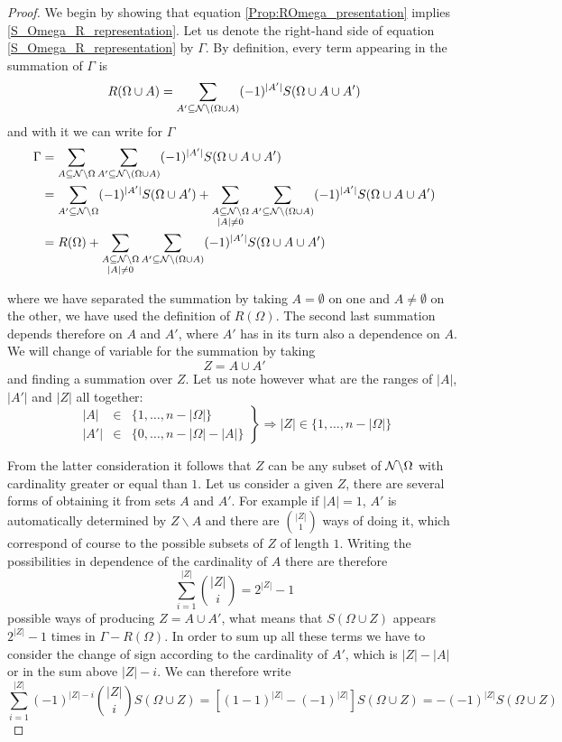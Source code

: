 \documentclass[10pt, a4paper]{amsart}
\begin{document}
\begin{proof}
We begin by showing that equation \ref{Prop:ROmega_presentation} implies \ref{S_Omega_R_representation}.
Let us denote the right-hand side of equation \ref{S_Omega_R_representation} by $\Gamma$. By definition, every term appearing in the summation of $\Gamma$ is 
$$
R ( \Omega \cup A) =
\sum_{A' \subseteq \mathcal{N} \backslash (\Omega \cup A)}
(-1)^{|A'|}
S(\Omega \cup A \cup A' )
$$
and with it we can write for $\Gamma$
\begin{align*}
\Gamma &= 
\sum_{A\subseteq \mathcal{N} \backslash \Omega}
\sum_{A' \subseteq \mathcal{N} \backslash (\Omega \cup A)}
(-1)^{|A'|}
S(\Omega \cup A \cup A' )\\
&=
\sum_{A' \subseteq \mathcal{N} \backslash \Omega}
(-1)^{|A'|}
S(\Omega \cup A' )
+
\sum_{\substack{A\subseteq \mathcal{N} \backslash \Omega\\ |A|\neq 0} }
\sum_{A' \subseteq \mathcal{N} \backslash (\Omega \cup A)}
(-1)^{|A'|}
S(\Omega \cup A \cup A' )\\
&= 
R(\Omega) 
+
\sum_{\substack{A\subseteq \mathcal{N} \backslash \Omega\\ |A|\neq 0} }
\sum_{A' \subseteq \mathcal{N} \backslash (\Omega \cup A)}
(-1)^{|A'|}
S(\Omega \cup A \cup A' )
\end{align*}

where we have separated the summation by taking $A = \emptyset $ on one and $A \neq \emptyset$ on the other,  we have used the definition of $R(\Omega )$. The second last summation depends therefore on $A$ and $A'$, where $A'$ has in its turn also a dependence on $A$. We will change of variable for the summation by taking 
$$
Z = A \cup A'
$$
and finding a summation over $Z$. Let us note however what are the ranges of $|A|$, $|A'|$ and $|Z|$ all together:
$$
\left .
\begin{matrix}
|A| &\in & \{ 1, \ldots , n -|\Omega | \}\\
|A'| &\in& \{ 0 , \ldots , n-|\Omega| - |A| \}
\end{matrix}
\right \}
\Rightarrow
|Z| \in \{1, \ldots , n-|\Omega| \}
$$ 

From the latter consideration it follows that $Z$ can be any subset of $\mathcal{N} \backslash \Omega$ with cardinality greater or equal than $1$. 
Let us consider a given $Z$, there are several forms of obtaining it from sets $A$ and $A'$. For example if $|A| = 1$, $A'$ is automatically determined by $Z\backslash A$ and there are $\binom{|Z|}{1} $ ways of doing it, which correspond of course to the possible  subsets of $Z$ of length $1$. Writing the possibilities in dependence of the cardinality of $A$ there are therefore
$$
\sum_{i=1}^{|Z|}\binom{|Z|}{i} = 2^{|Z|}-1
$$
possible ways of producing $Z = A \cup A'$, what means that $S(\Omega \cup Z)$ appears $2^{|Z|}-1$ times in $\Gamma - R(\Omega)$. In order to sum up all these terms we have to consider the change of sign according to the cardinality of $A'$, which is $|Z|-|A|$ or in the sum above $|Z|-i$. We can therefore write 
$$
\sum_{i=1}^{|Z|}(-1)^{|Z|-i}\binom{|Z|}{i}S(\Omega \cup Z) = [(1-1)^{|Z|}-(-1)^{|Z|}]S(\Omega \cup Z)
=
-(-1)^{|Z|}S(\Omega \cup Z)
$$


\end{proof}
\end{document}
